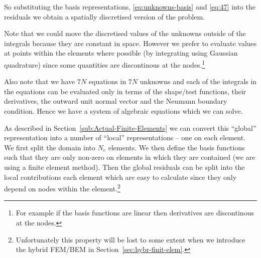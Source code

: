 So substituting the basis representations, \eqref{eq:unknowns-basis} and \eqref{eq:47} into the residuals we obtain a spatially discretised version of the problem.


Note that we could move the discretised values of the unknowns outside of the integrals because they are constant in space. However we prefer to evaluate values at points within the elements where possible (by integrating using Gaussian quadrature) since some quantities are discontinous at the nodes.\footnote{For example if the basis functions are linear then derivatives are discontinous at the nodes.}

Also note that we have $7N$ equations in $7N$ unknowns and each of the integrals in the equations can be evaluated only in terms of the shape/test functions, their derivatives, the outward unit normal vector and the Neumann boundary condition. Hence we have a system of algebraic equations which we can solve.

As described in Section~\ref{sub:Actual-Finite-Elements} we can convert this ``global'' representation into a number of ``local'' representations -- one on each element. We first split the domain into $N_e$ elements. We then define the basis functions such that they are only non-zero on elements in which they are contained (\ie we are using a finite element method). Then the global residuals can be split into the local contributions each element which are easy to calculate since they only depend on nodes within the element.\footnote{Unfortunately this property will be lost to some extent when we introduce the hybrid FEM/BEM in Section~\ref{sec:hybr-finit-elem}.}

